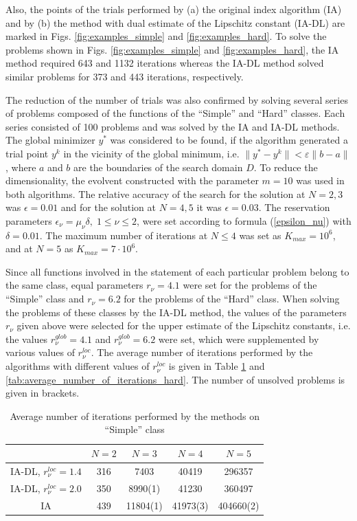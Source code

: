 \documentclass[preprint]{elsarticle}
\begin{document}
	Also, the points of the trials performed by (a) the original index algorithm (IA) and by (b) the method with dual estimate of the Lipschitz constant (IA-DL) are marked in Figs. \ref{fig:examples_simple} and \ref{fig:examples_hard}. To solve the problems shown in Figs. \ref{fig:examples_simple} and \ref{fig:examples_hard}, the IA method required 643 and 1132 iterations whereas the IA-DL method solved similar problems for 373 and 443 iterations, respectively.
	
	The reduction of the number of trials was also confirmed by solving several series of  problems composed of the functions of the “Simple” and “Hard” classes. Each series consisted of 100 problems and was solved by the IA and IA-DL methods. The global minimizer $y^{\ast}$ was considered to be found, if the algorithm generated a trial point $y^k$ in the vicinity of the global minimum, i.e. $\| y^{\ast} - y^k \| < \varepsilon \|b - a\|$, where $a$ and $b$ are the boundaries of the search domain $D$. To reduce the dimensionality, the evolvent constructed with the parameter $m=10$ was used in both algorithms. The relative accuracy of the search for the solution at $N = 2, 3$ was $\epsilon=0.01$ and for the solution at $N=4,5$  it was $\epsilon=0.03$. The reservation parameters $\epsilon_{\nu}=\mu_{\nu} \delta,\; 1 \leq \nu \leq 2$, were set according to formula (\ref{epsilon_nu}) with $\delta=0.01$. The maximum number of iterations at $N \leq 4$ was set as $K_{max} = 10^6$, and at $N=5$ as $K_{max}=7 \cdot 10^6$.

	Since all functions involved in the statement of each particular problem belong to the same class, equal parameters $r_{\nu}=4.1$ were set for the problems of the “Simple” class and $r_{\nu}=6.2$ for the problems of the “Hard” class. When solving the problems of these classes by the IA-DL method, the values of the parameters $r_{\nu}$ given above were selected for the upper estimate of the Lipschitz constants, i.e. the values $r_{\nu}^{glob}=4.1$ and $r_{\nu}^{glob}=6.2$ were set, which were supplemented by various values of $r_{\nu}^{loc}$. The average number of iterations performed by the algorithms with different values of $r_{\nu}^{loc}$ is given in Table \ref{tab:average_number_of_iterations_simple} and \ref{tab:average_number_of_iterations_hard}. The number of unsolved problems is given in brackets.

\begin{table}[h!]
	\centering
		\begin{tabular}{ccccc}
			\hline
			& $N=2$ & $N=3$ & $N=4$ & $N=5$ \\
			\hline
			IA-DL, $r_{\nu}^{loc}=1.4$ & 316 & 7403 & 40419 & 296357 \\
			\hline
			IA-DL, $r_{\nu}^{loc}=2.0$ & 350 & 8990(1) & 41230 & 360497 \\
			\hline
			IA & 439 & 11804(1) & 41973(3) & 404660(2) \\
			\hline
		\end{tabular}
	\caption{Average number of iterations performed by the methods on “Simple” class}
	\label{tab:average_number_of_iterations_simple}
\end{table}
\end{document}
